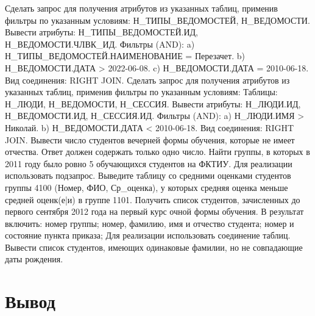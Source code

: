 \documentclass{article}
\begin{document}
Сделать запрос для получения атрибутов из указанных таблиц, 
применив фильтры по указанным условиям:
Н\_ТИПЫ\_ВЕДОМОСТЕЙ, Н\_ВЕДОМОСТИ.
Вывести атрибуты: Н\_ТИПЫ\_ВЕДОМОСТЕЙ.ИД, Н\_ВЕДОМОСТИ.ЧЛВК\_ИД.
Фильтры (AND):
a) Н\_ТИПЫ\_ВЕДОМОСТЕЙ.НАИМЕНОВАНИЕ = Перезачет.
b) Н\_ВЕДОМОСТИ.ДАТА > 2022-06-08.
c) Н\_ВЕДОМОСТИ.ДАТА = 2010-06-18.
Вид соединения: RIGHT JOIN.
Сделать запрос для получения атрибутов из указанных таблиц, применив фильтры по указанным условиям:
Таблицы: Н\_ЛЮДИ, Н\_ВЕДОМОСТИ, Н\_СЕССИЯ.
Вывести атрибуты: Н\_ЛЮДИ.ИД, Н\_ВЕДОМОСТИ.ИД, Н\_СЕССИЯ.ИД.
Фильтры (AND):
a) Н\_ЛЮДИ.ИМЯ > Николай.
b) Н\_ВЕДОМОСТИ.ДАТА < 2010-06-18.
Вид соединения: RIGHT JOIN.
Вывести число студентов вечерней формы обучения, которые не имеет отчества.
Ответ должен содержать только одно число.
Найти группы, в которых в 2011 году было ровно 5 обучающихся студентов на ФКТИУ.
Для реализации использовать подзапрос.
Выведите таблицу со средними оценками студентов группы 4100 (Номер, ФИО, Ср\_оценка), у которых средняя оценка меньше средней оценк(е|и) в группе 1101.
Получить список студентов, зачисленных до первого сентября 2012 года на первый курс очной формы обучения. В результат включить:
номер группы;
номер, фамилию, имя и отчество студента;
номер и состояние пункта приказа;
Для реализации использовать соединение таблиц.
Вывести список студентов, имеющих одинаковые фамилии, но не совпадающие даты рождения.

\section{Вывод}


    
\end{document}
